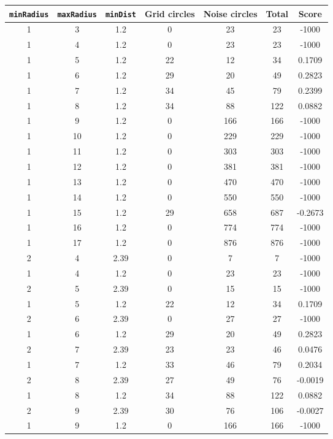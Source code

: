 \documentclass[letterpaper, 12pt]{article}
\begin{document}
\begin{longtable}{|c|c|c|c|c|c|c|}
\hline
\textbf{\texttt{minRadius}} & \textbf{\texttt{maxRadius}} & \textbf{\texttt{minDist}} & \textbf{Grid circles} & \textbf{Noise circles} & \textbf{Total} & \textbf{Score} \\
\hline
1 & 3 & 1.2 & 0 & 23 & 23 & -1000 \\
\hline
1 & 4 & 1.2 & 0 & 23 & 23 & -1000 \\
\hline
1 & 5 & 1.2 & 22 & 12 & 34 & 0.1709 \\
\hline
1 & 6 & 1.2 & 29 & 20 & 49 & 0.2823 \\
\hline
1 & 7 & 1.2 & 34 & 45 & 79 & 0.2399 \\
\hline
1 & 8 & 1.2 & 34 & 88 & 122 & 0.0882 \\
\hline
1 & 9 & 1.2 & 0 & 166 & 166 & -1000 \\
\hline
1 & 10 & 1.2 & 0 & 229 & 229 & -1000 \\
\hline
1 & 11 & 1.2 & 0 & 303 & 303 & -1000 \\
\hline
1 & 12 & 1.2 & 0 & 381 & 381 & -1000 \\
\hline
1 & 13 & 1.2 & 0 & 470 & 470 & -1000 \\
\hline
1 & 14 & 1.2 & 0 & 550 & 550 & -1000 \\
\hline
1 & 15 & 1.2 & 29 & 658 & 687 & -0.2673 \\
\hline
1 & 16 & 1.2 & 0 & 774 & 774 & -1000 \\
\hline
1 & 17 & 1.2 & 0 & 876 & 876 & -1000 \\
\hline
2 & 4 & 2.39 & 0 & 7 & 7 & -1000 \\
\hline
1 & 4 & 1.2 & 0 & 23 & 23 & -1000 \\
\hline
2 & 5 & 2.39 & 0 & 15 & 15 & -1000 \\
\hline
1 & 5 & 1.2 & 22 & 12 & 34 & 0.1709 \\
\hline
2 & 6 & 2.39 & 0 & 27 & 27 & -1000 \\
\hline
1 & 6 & 1.2 & 29 & 20 & 49 & 0.2823 \\
\hline
2 & 7 & 2.39 & 23 & 23 & 46 & 0.0476 \\
\hline
1 & 7 & 1.2 & 33 & 46 & 79 & 0.2034 \\
\hline
2 & 8 & 2.39 & 27 & 49 & 76 & -0.0019 \\
\hline
1 & 8 & 1.2 & 34 & 88 & 122 & 0.0882 \\
\hline
2 & 9 & 2.39 & 30 & 76 & 106 & -0.0027 \\
\hline
1 & 9 & 1.2 & 0 & 166 & 166 & -1000 \\

\end{longtable}
\end{document}
